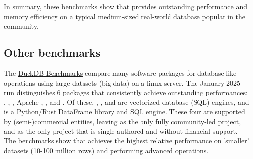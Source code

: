 \documentclass[nojss]{jss} %
\begin{document}
In summary, these benchmarks show that  provides outstanding performance and memory efficiency on a typical medium-sized real-world database popular in the  community.
%
%
%
%
\subsection{Other benchmarks}
%
The \href{https://duckdblabs.github.io/db-benchmark/}{DuckDB Benchmarks} compare many software packages for database-like operations using large datasets (big data) on a linux server. The January 2025 run distinguishes 6 packages that consistently achieve outstanding performances: , , , Apache , , and . Of these, , , and  are vectorized database (SQL) engines, and  is a Python/Rust DataFrame library and SQL engine. These four are supported by (semi-)commercial entities, leaving  as the only fully community-led project, and  as the only project that is single-authored and without financial support. The benchmarks show that  achieves the highest relative performance on 'smaller' datasets (10-100 million rows) and performing advanced operations. %
\end{document}
